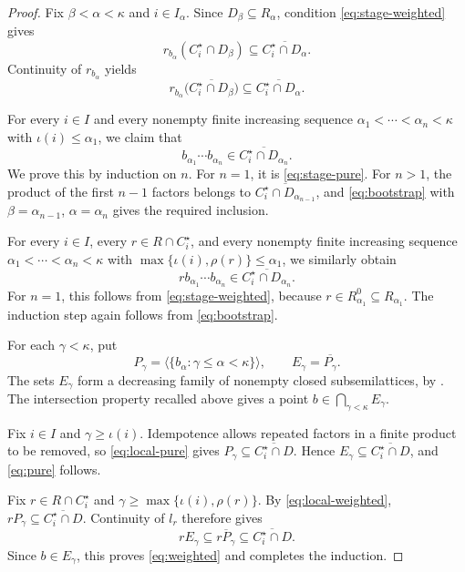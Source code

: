 \documentclass[11pt,a4paper]{article}
\theoremstyle{definition}
\theoremstyle{remark}
\numberwithin{equation}{section}
\newcommand{\gen}[1]{\langle #1\rangle}
\newcommand{\cl}[1]{\overline{#1}}
\begin{document}
\begin{proof}
Fix \(\beta<\alpha<\kappa\) and \(i\in I_\alpha\).
Since \(D_\beta\subseteq R_\alpha\), condition
\eqref{eq:stage-weighted} gives
\[
r_{b_\alpha}(C_i^\star\cap D_\beta)
\subseteq\cl{C_i^\star\cap D_\alpha}.
\]
Continuity of \(r_{b_\alpha}\) yields
\begin{equation}\label{eq:bootstrap}
r_{b_\alpha}\bigl(\cl{C_i^\star\cap D_\beta}\bigr)
\subseteq\cl{C_i^\star\cap D_\alpha}.
\end{equation}

For every \(i\in I\) and every nonempty finite increasing sequence
\(\alpha_1<\cdots<\alpha_n<\kappa\) with \(\iota(i)\le\alpha_1\), we claim that
\begin{equation}\label{eq:local-pure}
b_{\alpha_1}\cdots b_{\alpha_n}\in\cl{C_i^\star\cap D_{\alpha_n}}.
\end{equation}
We prove this by induction on \(n\). For \(n=1\), it is
\eqref{eq:stage-pure}. For \(n>1\), the product of the first \(n-1\)
factors belongs to \(\cl{C_i^\star\cap D_{\alpha_{n-1}}}\), and
\eqref{eq:bootstrap} with \(\beta=\alpha_{n-1}\), \(\alpha=\alpha_n\)
gives the required inclusion.

For every \(i\in I\), every \(r\in R\cap C_i^\star\), and every
nonempty finite increasing sequence \(\alpha_1<\cdots<\alpha_n<\kappa\)
with \(\max\{\iota(i),\rho(r)\}\le\alpha_1\), we similarly obtain
\begin{equation}\label{eq:local-weighted}
r b_{\alpha_1}\cdots b_{\alpha_n}\in\cl{C_i^\star\cap D_{\alpha_n}}.
\end{equation}
For \(n=1\), this follows from \eqref{eq:stage-weighted}, because
\(r\in R_{\alpha_1}^0\subseteq R_{\alpha_1}\).
The induction step again follows from \eqref{eq:bootstrap}.

For each \(\gamma<\kappa\), put
\[
P_\gamma=\gen{\{b_\alpha:\gamma\le\alpha<\kappa\}},\qquad
E_\gamma=\cl{P_\gamma}.
\]
The sets \(E_\gamma\) form a decreasing family of nonempty closed
subsemilattices, by \cite[Theorem~2.27]{HS}. The intersection property
recalled above gives a point \(b\in\bigcap_{\gamma<\kappa}E_\gamma\).

Fix \(i\in I\) and \(\gamma\ge\iota(i)\). Idempotence allows
repeated factors in a finite product to be removed, so
\eqref{eq:local-pure} gives
\(P_\gamma\subseteq\cl{C_i^\star\cap D}\). Hence
\(E_\gamma\subseteq\cl{C_i^\star\cap D}\), and \eqref{eq:pure} follows.

Fix \(r\in R\cap C_i^\star\) and
\(\gamma\ge\max\{\iota(i),\rho(r)\}\). By \eqref{eq:local-weighted},
\(rP_\gamma\subseteq\cl{C_i^\star\cap D}\). Continuity of \(l_r\)
therefore gives
\[
rE_\gamma\subseteq\cl{rP_\gamma}\subseteq\cl{C_i^\star\cap D}.
\]
Since \(b\in E_\gamma\), this proves \eqref{eq:weighted} and completes
the induction.
\end{proof}
\end{document}
